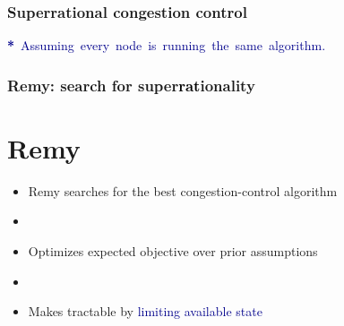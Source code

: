 \documentclass[svgnames]{beamer}
\newcommand{\ssline}{\vspace{8 pt}}
\begin{document}
\begin{frame}
\frametitle{Superrational congestion control}

\begin{centering}

\ssline
\ssline
\ssline

\end{centering}

\Large \noindent \hspace{-.5cm} \mbox{\textcolor{DarkBlue}{\textbf{*} Assuming every node is running the same algorithm.}}

\end{frame}

\begin{frame}
\frametitle{Remy: search for super\textcolor{Black}{rat}ionality}

\section{Remy}

\large

\begin{itemize}

\item Remy searches for the best congestion-control algorithm

\item[]

\item Optimizes expected objective over prior assumptions

\item[]

\item Makes tractable by \textcolor{DarkBlue}{limiting available state}

\end{itemize}

\end{frame}
\end{document}
